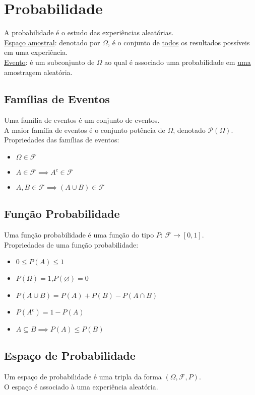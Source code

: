 \documentclass{article}
\begin{document}
\section{Probabilidade}
A probabilidade é o estudo das experiências aleatórias. \\[10pt]
\uline{Espaço amostral}: denotado por $\Omega$, é o conjunto de \uline{todos} os resultados possíveis em uma experiência. \\[5pt]
\uline{Evento}: é um subconjunto de $\Omega$ ao qual é associado uma probabilidade em \uline{uma} amostragem aleatória.


\subsection{Famílias de Eventos}
Uma família de eventos é um conjunto de eventos. \\
A maior família de eventos é o conjunto potência de $\Omega$, denotado $\mathcal{P}(\Omega)$. \\[5pt]
Propriedades das famílias de eventos:
\begin{itemize}
  \item $\Omega \in \mathcal{F}$
  \item $A \in \mathcal{F} \implies A^c \in \mathcal{F}$
  \item $A, B \in \mathcal{F} \implies (A \cup B) \in \mathcal{F}$
\end{itemize}


\subsection{Função Probabilidade}
Uma função probabilidade é uma função do tipo $P:\, \mathcal{F} \to [0, 1]$. \\[5pt]
Propriedades de uma função probabilidade:
\begin{itemize}
  \item $0 \leq P(A) \leq 1$
  \item $P(\Omega) = 1$,\enspace $P(\varnothing) = 0$
  \item $P(A \cup B) = P(A) + P(B) - P(A \cap B)$
  \item $P(A^c) = 1 - P(A)$
  \item $A \subseteq B \implies P(A) \leq P(B)$
\end{itemize}


\subsection{Espaço de Probabilidade}
Um espaço de probabilidade é uma tripla da forma $(\Omega, \mathcal{F}, P)$. \\
O espaço é associado à uma experiência aleatória.
\end{document}
